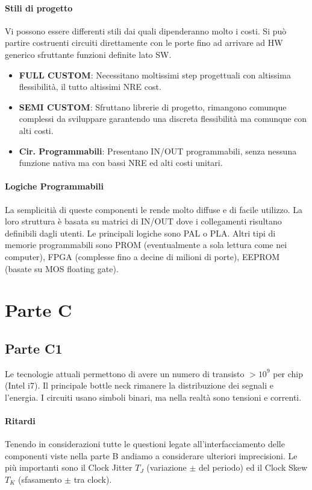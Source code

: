 \documentclass[12pt]{article}
\begin{document}
\paragraph{Stili di progetto}
Vi possono essere differenti stili dai quali dipenderanno molto i costi. Si può partire costruenti circuiti direttamente con le porte fino ad arrivare ad HW generico sfruttante funzioni definite lato SW.
\begin{itemize}
  \item \textbf{FULL CUSTOM}: Necessitano moltissimi step progettuali con altissima flessibilità, il tutto altissimi NRE cost.
  \item \textbf{SEMI CUSTOM}: Sfruttano librerie di progetto, rimangono comunque complessi da sviluppare garantendo una discreta flessibilità ma comunque con alti costi.
  \item \textbf{Cir. Programmabili}: Presentano IN/OUT programmabili, senza nessuna funzione nativa ma con bassi NRE ed alti costi unitari.
\end{itemize}

\paragraph{Logiche Programmabili}
La semplicitià di queste componenti le rende molto diffuse e di facile utilizzo. La loro struttura è basata su matrici di IN/OUT dove i collegamenti risultano definibili dagli utenti. Le principali logiche sono PAL o PLA. Altri tipi di memorie programmabili sono PROM (eventualmente a sola lettura come nei computer), FPGA (complesse fino a decine di milioni di porte), EEPROM (basate su MOS floating gate).

\section{Parte C}
\subsection{Parte C1}\label{c1}
Le tecnologie attuali permettono di avere un numero di transisto $>10^9$ per chip (Intel i7). Il principale bottle neck rimanere la distribuzione dei segnali e l'energia. I circuiti usano simboli binari, ma nella realtà sono tensioni e correnti.

\paragraph{Ritardi}
Tenendo in considerazioni tutte le questioni legate all'interfacciamento delle componenti viste nella parte B andiamo a considerare ulteriori imprecisioni. Le più importanti sono il Clock Jitter $T_{J}$ (variazione $\pm$ del periodo) ed il Clock Skew $T_{K}$ (sfasamento $\pm$ tra clock).
\end{document}
